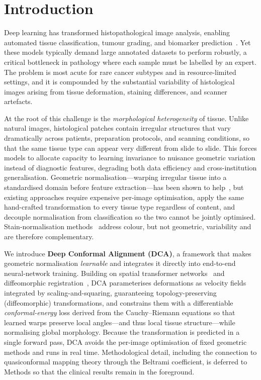 \documentclass[pdflatex,sn-nature]{sn-jnl}%
\theoremstyle{thmstyleone}%
\theoremstyle{thmstyletwo}%
\theoremstyle{thmstylethree}%
\begin{document}
\section{Introduction}
\label{sec:introduction}

Deep learning has transformed histopathological image analysis, enabling
automated tissue classification, tumour grading, and biomarker
prediction~\cite{huang2024surface,kuntz2021gastrointestinal,chaunzwa2021deep,hirra2021breast,wetstein2022deep}.
Yet these models typically demand large annotated datasets to perform robustly,
a critical bottleneck in pathology where each sample must be labelled by an
expert. The problem is most acute for rare cancer subtypes and in
resource-limited settings, and it is compounded by the substantial variability of
histological images arising from tissue deformation, staining differences, and
scanner artefacts.

At the root of this challenge is the \textit{morphological heterogeneity} of
tissue. Unlike natural images, histological patches contain irregular structures
that vary dramatically across patients, preparation protocols, and scanning
conditions, so that the same tissue type can appear very different from slide to
slide. This forces models to allocate capacity to learning invariance to
nuisance geometric variation instead of diagnostic features, degrading both data
efficiency and cross-institution generalisation. Geometric normalisation---warping
irregular tissue into a standardised domain before feature extraction---has been
shown to help~\cite{huang2024surface}, but existing approaches require expensive
per-image optimisation, apply the same hand-crafted transformation to every
tissue type regardless of content, and decouple normalisation from classification
so the two cannot be jointly optimised. Stain-normalisation
methods~\cite{macenko2009method,shaban2019staingan} address colour, but not
geometric, variability and are therefore complementary.

We introduce \textbf{Deep Conformal Alignment (DCA)}, a framework that makes
geometric normalisation \textit{learnable} and integrates it directly into
end-to-end neural-network training. Building on spatial transformer
networks~\cite{jaderberg2015spatial} and diffeomorphic
registration~\cite{balakrishnan2019voxelmorph}, DCA parameterises deformations as
velocity fields integrated by scaling-and-squaring, guaranteeing
topology-preserving (diffeomorphic) transformations, and constrains them with a
differentiable \textit{conformal-energy} loss derived from the Cauchy--Riemann
equations so that learned warps preserve local angles---and thus local tissue
structure---while normalising global morphology. Because the transformation is
predicted in a single forward pass, DCA avoids the per-image optimisation of fixed
geometric methods and runs in real time. Methodological detail, including the
connection to quasiconformal mapping theory through the Beltrami coefficient, is
deferred to Methods so that the clinical results remain in the foreground.
\end{document}
